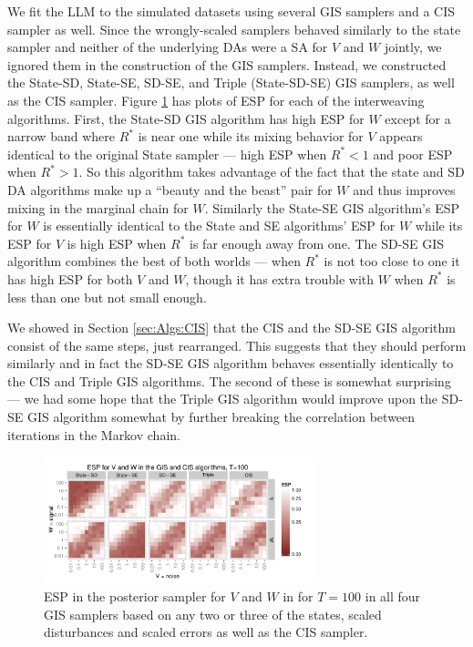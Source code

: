 \documentclass[12pt]{article}
\begin{document}
We fit the LLM to the simulated datasets using several GIS samplers and a CIS sampler as well. Since the wrongly-scaled samplers behaved similarly to the state sampler and neither of the underlying DAs were a SA for $V$ and $W$ jointly, we ignored them in the construction of the GIS samplers. Instead, we constructed the State-SD, State-SE, SD-SE, and Triple (State-SD-SE) GIS samplers, as well as the CIS sampler. Figure \ref{intESplot} has plots of ESP for each of the interweaving algorithms. First, the State-SD GIS algorithm has high ESP for $W$ except for a narrow band where $R^*$ is near one while its mixing behavior for $V$ appears identical to the original State sampler --- high ESP when $R^* < 1$ and poor ESP when $R^* > 1$. So this algorithm takes advantage of the fact that the state and SD DA algorithms make up a ``beauty and the beast'' pair for $W$ and thus improves mixing in the marginal chain for $W$. Similarly the State-SE GIS algorithm's ESP for $W$ is essentially identical to the State and SE algorithms' ESP for $W$ while its ESP for $V$ is high ESP when $R^*$ is far enough away from one. The SD-SE GIS algorithm combines the best of both worlds --- when $R^*$ is not too close to one it has high ESP for both $V$ and $W$, though it has extra trouble with $W$ when $R^*$ is less than one but not small enough. 

We showed in Section \ref{sec:Algs:CIS} that the CIS and the SD-SE GIS algorithm consist of the same steps, just rearranged. This suggests that they should perform similarly and in fact the SD-SE GIS algorithm behaves essentially identically to the CIS and Triple GIS algorithms. The second of these is somewhat surprising --- we had some hope that the Triple GIS algorithm would improve upon the SD-SE GIS algorithm somewhat by further breaking the correlation between iterations in the Markov chain.


\begin{figure}[!h]
\centering
\includegraphics[width=0.7\textwidth]{intESplot100}
\caption{ESP in the posterior sampler for $V$ and $W$ in for $T=100$ in all four GIS samplers based on any two or three of the states, scaled disturbances and scaled errors as well as the CIS sampler.}
\label{intESplot}
\end{figure}
\end{document}
